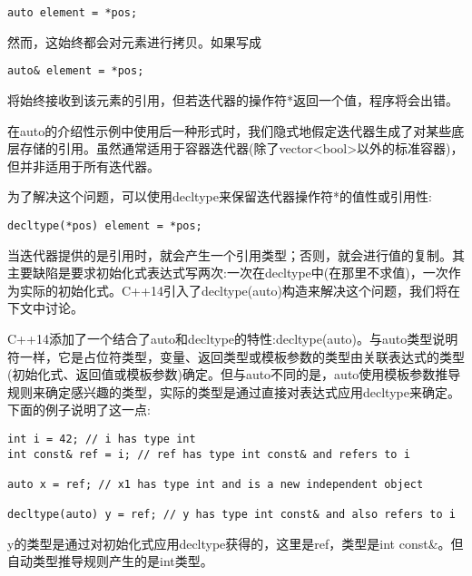 \begin{lstlisting}[style=styleCXX]
auto element = *pos;
\end{lstlisting}

然而，这始终都会对元素进行拷贝。如果写成

\begin{lstlisting}[style=styleCXX]
auto& element = *pos;
\end{lstlisting}

将始终接收到该元素的引用，但若迭代器的操作符*返回一个值，程序将会出错。

\begin{tcolorbox}[colback=webgreen!5!white,colframe=webgreen!75!black]
\hspace*{0.75cm}在auto的介绍性示例中使用后一种形式时，我们隐式地假定迭代器生成了对某些底层存储的引用。虽然通常适用于容器迭代器(除了vector<bool>以外的标准容器)，但并非适用于所有迭代器。
\end{tcolorbox}

为了解决这个问题，可以使用decltype来保留迭代器操作符*的值性或引用性:

\begin{lstlisting}[style=styleCXX]
decltype(*pos) element = *pos;
\end{lstlisting}

当迭代器提供的是引用时，就会产生一个引用类型；否则，就会进行值的复制。其主要缺陷是要求初始化式表达式写两次:一次在decltype中(在那里不求值)，一次作为实际的初始化式。C++14引入了decltype(auto)构造来解决这个问题，我们将在下文中讨论。


C++14添加了一个结合了auto和decltype的特性:decltype(auto)。与auto类型说明符一样，它是占位符类型，变量、返回类型或模板参数的类型由关联表达式的类型(初始化式、返回值或模板参数)确定。但与auto不同的是，auto使用模板参数推导规则来确定感兴趣的类型，实际的类型是通过直接对表达式应用decltype来确定。下面的例子说明了这一点:

\begin{lstlisting}[style=styleCXX]
int i = 42; // i has type int
int const& ref = i; // ref has type int const& and refers to i

auto x = ref; // x1 has type int and is a new independent object

decltype(auto) y = ref; // y has type int const& and also refers to i
\end{lstlisting}

y的类型是通过对初始化式应用decltype获得的，这里是ref，类型是int const\&。但自动类型推导规则产生的是int类型。

